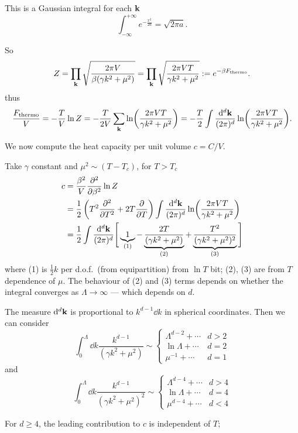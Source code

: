 \documentclass[a4paper,11pt]{article}
\begin{document}
	This is a Gaussian integral for each $\vb k$ 
	\[
		\int_{-\infty}^{+\infty} e ^{- \frac{x^2}{2a}} = \sqrt{2 \pi a}.
	\]
	
	So
	\[
		Z = \prod _{\vb k} \sqrt{\frac{2 \pi V}{\beta (\gamma k^2 + \mu^2)}} = \prod _{\vb k} \sqrt{\frac{2 \pi V T}{\gamma k^2 + \mu^2}} := e ^{- \beta F _{\text{thermo}}}.
	\]
	thus
	\[
		\frac{F _{\text{thermo}}}{V} = - \frac{T}{V} \ln Z = - \frac{T}{2V} \sum _{\vb k} \ln(\frac{2 \pi V T}{\gamma k^2 + \mu^2}) = - \frac{T}{2} \int \frac{\dd[d]{\vb k}}{(2\pi)^d} \ln(\frac{2 \pi V T}{\gamma k^2 + \mu^2}).
	\]
	
	We now compute the heat capacity per unit volume $c = C/V$.

	Take $\gamma$ constant and $\mu^2 \sim (T - T_c)$, for $T > T_c$
	\begin{align*}
		c & = \frac{\beta^2}{V} \pdv[2]{\beta} \ln Z\\
		& = \frac{1}{2} \left( T^2 \pdv[2]{T} + 2 T \pdv{T} \right) \int \frac{\dd[d]{\vb k}}{(2 \pi)^d}\ln(\frac{2 \pi V T}{\gamma k^2 + \mu^2})\\
		& = \frac{1}{2} \int \frac{\dd[d]{\vb k}}{(2 \pi)^d} \Bigg[ \underbrace{1}_{(1)} - \underbrace{\frac{2T}{(\gamma k^2 + \mu^2)}}_{(2)} + \underbrace{\frac{T^2}{(\gamma k^2 + \mu^2)^2}}_{(3)} \Bigg]
	\end{align*}
	where (1) is $\frac{1}{2} k$ per d.o.f.\ (from equipartition) from $\ln T$ bit; (2), (3) are from $T$ dependence of $\mu$. The behaviour of (2) and (3) terms depends on whether the integral converges as $\Lambda \to \infty$ --- which depends on $d$.

	The measure $\dd[d]{\vb k}$ is proportional to $k ^{d-1} \dd{k}$ in spherical coordinates. Then we can consider
	\[
		\int_{0}^{\Lambda} \dd{k} \frac{k ^{d-1}}{(\gamma k^2 + \mu^2)} \sim \begin{cases}
			\Lambda ^{d-2} + \cdots & d>2\\
			\ln \Lambda + \cdots & d = 2\\
			\mu^{-1} + \cdots & d = 1
		\end{cases}
	\]
	and
	\[
		\int_{0}^{\Lambda} \dd{k} \frac{k ^{d-1}}{(\gamma k^2 + \mu^2)^2} \sim \begin{cases}
			\Lambda ^{d-4} + \cdots & d>4\\
			\ln \Lambda + \cdots & d = 4\\
			\mu^{d-4} + \cdots & d < 4
		\end{cases}
	\]
	
	For $d \geq 4$, the leading contribution to $c$ is independent of $T$;
	
\end{document}
